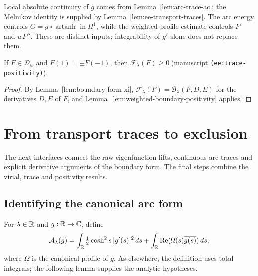 \begin{remark}
Local absolute continuity of $g$ comes from Lemma~\ref{lem:arc-trace-ac};
the Melnikov identity is supplied by Lemma~\ref{lem:ee-transport-traces}.
The arc energy controls $G=g\circ\operatorname{artanh}$ in $H^1$, while
the weighted profile estimate controls $F'$ and $wF''$. These are
distinct inputs; integrability of $g'$ alone does not replace them.
\end{remark}

\begin{lemma}
\label{lem:ee-trace-positivity}
\leanok
If $F\in\mathcal D_w$ and $F(1)=\pm F(-1)$, then
$\mathcal F_\lambda(F)\ge0$ (manuscript \texttt{(ee:trace-positivity)}).
\end{lemma}

\begin{proof}
\leanok
By Lemma~\ref{lem:boundary-form-xi},
$\mathcal F_\lambda(F)=\mathcal B_\lambda(F,D,E)$ for the derivatives $D,E$
of $F$, and Lemma~\ref{lem:weighted-boundary-positivity} applies.
\end{proof}

\section{From transport traces to exclusion}
\label{sec:ee-assembly}

The next interfaces connect the raw eigenfunction lifts, continuous arc
traces and explicit derivative arguments of the boundary form. The final
steps combine the virial, trace and positivity results.

\subsection{Identifying the canonical arc form}

\begin{definition}
\label{def:canonical-arc-form}
\leanok
For $\lambda\in\mathbb{R}$ and $g:\mathbb{R}\to\mathbb{C}$, define
\[
  \mathcal A_\lambda(g)=
  \int_{\mathbb{R}}\tfrac12\cosh^2s\,|g'(s)|^2\,ds
  +\int_{\mathbb{R}}\operatorname{Re}(\Omega(s)\overline{g(s)})\,ds,
\]
where $\Omega$ is the canonical profile of $g$. As elsewhere, the definition uses
total integrals; the following lemma supplies the analytic hypotheses.
\end{definition}

